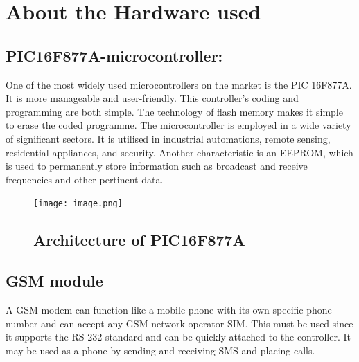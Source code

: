 \documentclass{wsdcr}
\begin{document}
\section{About the Hardware used}
\subsection{PIC16F877A-microcontroller: }

One of the most widely used microcontrollers on the market is the PIC 16F877A. It is more manageable and user-friendly. This controller's coding and programming are both simple. The technology of flash memory makes it simple to erase the coded programme. The microcontroller is employed in a wide variety of significant sectors. It is utilised in industrial automations, remote sensing, residential appliances, and security. Another characteristic is an EEPROM, which is used to permanently store information such as broadcast and receive frequencies and other pertinent data.
\begin{figure}[t!]
    \centering
    \texttt{[image: image.png]}
    \caption{ }
\subsection{ Architecture of PIC16F877A }
    \label{fig:example}
\end{figure}

\subsection{GSM module}
A GSM modem can function like a mobile phone with its own specific phone number and can accept any GSM network operator SIM. This must be used since it supports the RS-232 standard and can be quickly attached to the controller. It may be used as a phone by sending and receiving SMS and placing calls.
\end{document}
